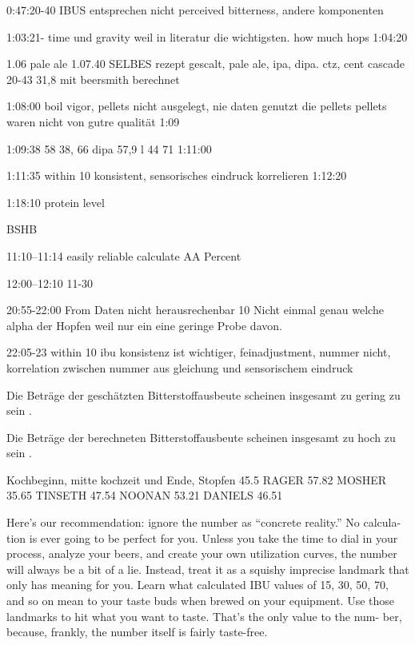\documentclass[a4paper,parskip=half]{scrartcl}
\begin{document}
0:47:20-40
IBUS entsprechen nicht perceived bitterness, andere komponenten



1:03:21- time und gravity weil in literatur
die wichtigsten. how much hops 1:04:20

1.06 pale ale 1.07.40
SELBES rezept gescalt, pale ale, ipa, dipa. ctz, cent cascade
20-43 31,8 mit beersmith berechnet

1:08:00 boil vigor, pellets nicht ausgelegt, nie daten genutzt die pellets
pellets waren nicht von gutre qualität 1:09

1:09:38 58
38, 66
dipa 57,9 l 44 71
1:11:00

1:11:35 within 10 %
konsistent, sensorisches eindruck korrelieren
1:12:20

1:18:10
protein level 
\parencite{Beechum2017a}

BSHB

11:10--11:14
easily reliable calculate AA Percent

12:00--12:10
11-30%

20:55-22:00
From Daten nicht herausrechenbar
10 %
Nicht einmal genau welche alpha der Hopfen weil nur ein eine geringe 
Probe davon.

22:05-23
within 10 ibu
konsistenz ist wichtiger, feinadjustment, nummer nicht,
korrelation zwischen nummer aus gleichung und sensorischem eindruck
\parencite{Smith2011}

Die Beträge der geschätzten
Bitterstoffausbeute scheinen insgesamt zu gering zu sein \parencite{Jones1995}.

Die Beträge
der berechneten Bitterstoffausbeute scheinen insgesamt zu hoch zu sein \parencite{Jones1995}.

\parencite[65]{Hall1997}
Kochbeginn, mitte kochzeit und Ende, Stopfen
45.5
RAGER  57.82
MOSHER 35.65
TINSETH  47.54
NOONAN 53.21
DANIELS 46.51

\parencite[65\psqq]{Beechum2017}
Here’s our recommendation: ignore the
number as “concrete reality.” No calcula-
tion is ever going to be perfect for you.
Unless you take the time to dial in your
process, analyze your beers, and create
your own utilization curves, the number
will always be a bit of a lie. Instead, treat it
as a squishy imprecise landmark that only
has meaning for you.
Learn what calculated IBU values of 15,
30, 50, 70, and so on mean to your taste
buds when brewed on your equipment.
Use those landmarks to hit what you want
to taste. That’s the only value to the num-
ber, because, frankly, the number itself is
fairly taste-free.
\end{document}
